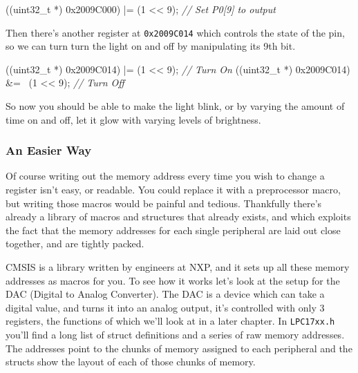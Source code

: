 \documentclass[]{article}
\newenvironment{Shaded}{\begin{snugshade}}{\end{snugshade}}
\newcommand{\DataTypeTok}[1]{\textcolor[rgb]{0.13,0.29,0.53}{{#1}}}
\newcommand{\DecValTok}[1]{\textcolor[rgb]{0.00,0.00,0.81}{{#1}}}
\newcommand{\BaseNTok}[1]{\textcolor[rgb]{0.00,0.00,0.81}{{#1}}}
\newcommand{\CommentTok}[1]{\textcolor[rgb]{0.56,0.35,0.01}{\textit{{#1}}}}
\newcommand{\NormalTok}[1]{{#1}}
\begin{document}
\begin{Shaded}
\begin{Highlighting}[]
    \NormalTok{((}\DataTypeTok{uint32_t} \NormalTok{*) }\BaseNTok{0x2009C000}\NormalTok{) |= (}\DecValTok{1} \NormalTok{<< }\DecValTok{9}\NormalTok{); }\CommentTok{// Set P0[9] to output}
\end{Highlighting}
\end{Shaded}

Then there's another register at \texttt{0x2009C014} which controls the
state of the pin, so we can turn turn the light on and off by
manipulating its 9th bit.

\begin{Shaded}
\begin{Highlighting}[]
    \NormalTok{((}\DataTypeTok{uint32_t} \NormalTok{*) }\BaseNTok{0x2009C014}\NormalTok{) |= (}\DecValTok{1} \NormalTok{<< }\DecValTok{9}\NormalTok{);  }\CommentTok{// Turn On}
    \NormalTok{((}\DataTypeTok{uint32_t} \NormalTok{*) }\BaseNTok{0x2009C014}\NormalTok{) &= ~(}\DecValTok{1} \NormalTok{<< }\DecValTok{9}\NormalTok{); }\CommentTok{// Turn Off}
\end{Highlighting}
\end{Shaded}

So now you should be able to make the light blink, or by varying the
amount of time on and off, let it glow with varying levels of
brightness.

\subsubsection{An Easier Way}

Of course writing out the memory address every time you wish to change a
register isn't easy, or readable. You could replace it with a
preprocessor macro, but writing those macros would be painful and
tedious. Thankfully there's already a library of macros and structures
that already exists, and which exploits the fact that the memory
addresses for each single peripheral are laid out close together, and
are tightly packed.

CMSIS is a library written by engineers at NXP, and it sets up all these
memory addresses as macros for you. To see how it works let's look at
the setup for the DAC (Digital to Analog Converter). The DAC is a device
which can take a digital value, and turns it into an analog output, it's
controlled with only 3 registers, the functions of which we'll look at
in a later chapter. In \texttt{LPC17xx.h} you'll find a long list of
struct definitions and a series of raw memory addresses. The addresses
point to the chunks of memory assigned to each peripheral and the
structs show the layout of each of those chunks of memory.
\end{document}
